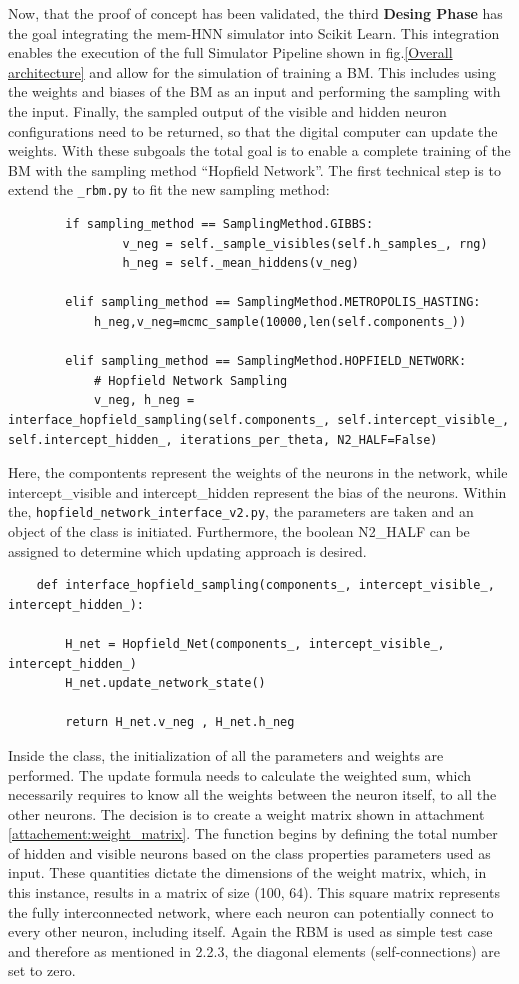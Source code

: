 Now, that the proof of concept has been validated, the third \textbf{Desing Phase} has the goal
integrating the \ac{mem-HNN} simulator into Scikit Learn. 
This integration enables the execution of the full Simulator Pipeline shown in fig.\ref{Overall architecture} and allow for the simulation of training a \ac{BM}.
This includes using the weights and biases of the \ac{BM} as an input and performing the sampling with the input.
Finally, the sampled output of the visible and hidden neuron configurations need to be returned, so that the digital computer can update the weights.
With these subgoals the total goal is to enable a complete training of the \ac{BM} with the sampling method ``Hopfield Network''. 
The first technical step is to extend the \texttt{\_rbm.py} to fit the new sampling method: 
\begin{lstlisting}
        if sampling_method == SamplingMethod.GIBBS:
                v_neg = self._sample_visibles(self.h_samples_, rng)
                h_neg = self._mean_hiddens(v_neg)

        elif sampling_method == SamplingMethod.METROPOLIS_HASTING:
            h_neg,v_neg=mcmc_sample(10000,len(self.components_))

        elif sampling_method == SamplingMethod.HOPFIELD_NETWORK:  
            # Hopfield Network Sampling
            v_neg, h_neg = interface_hopfield_sampling(self.components_, self.intercept_visible_, self.intercept_hidden_, iterations_per_theta, N2_HALF=False)    
\end{lstlisting}
Here, the compontents represent the weights of the neurons in the network, while intercept\_visible and intercept\_hidden represent the bias of the neurons. 
Within the, \texttt{hopfield\_network\_interface\_v2.py}, the parameters are taken and an object of the class is initiated. 
Furthermore, the boolean N2\_HALF can be assigned to determine which updating approach is desired. 
\begin{lstlisting}
    def interface_hopfield_sampling(components_, intercept_visible_, intercept_hidden_):
   
        H_net = Hopfield_Net(components_, intercept_visible_, intercept_hidden_)
        H_net.update_network_state()
        
        return H_net.v_neg , H_net.h_neg
\end{lstlisting}
Inside the class, the initialization of all the parameters and weights are performed. 
The update formula needs to calculate the weighted sum, which necessarily requires to know all the weights between the neuron itself, to all the other neurons. 
The decision is to create a weight matrix shown in attachment \ref{attachement:weight_matrix}. 
The function begins by defining the total number of hidden and visible neurons based on the class properties parameters used as input.
These quantities dictate the dimensions of the weight matrix, which, in this instance, results in a matrix of size (100, 64).
This square matrix represents the fully interconnected network, where each neuron can potentially connect to every other neuron, including itself.
Again the \ac{RBM} is used as simple test case and therefore as mentioned in 2.2.3, the diagonal elements (self-connections) are set to zero.


